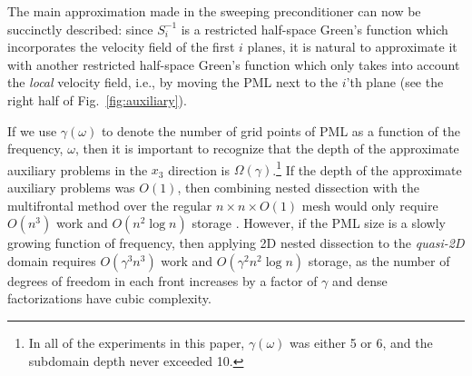 The main approximation made in the sweeping preconditioner can now be 
succinctly described: since $S_i^{-1}$ is a restricted half-space Green's 
function which incorporates the velocity field of the first $i$ planes, it is 
natural to approximate it with another restricted half-space
Green's function which only takes into account the {\em local} velocity field,
i.e., by moving the PML next to the $i$'th plane (see the right half of 
Fig.~\ref{fig:auxiliary}). 


If we use $\gamma(\omega)$ to denote the number of grid points of PML as a 
function of the frequency, $\omega$, then it is 
important to recognize that the depth of the approximate auxiliary problems
in the $x_3$ direction is $\Omega(\gamma)$.\footnote{In all of the experiments 
in this paper, $\gamma(\omega)$ was either 5 or 6, and the subdomain depth 
never exceeded 10.}
If the depth of the approximate auxiliary problems was $O(1)$, then 
combining nested dissection with the multifrontal method over the regular 
$n \times n \times O(1)$ mesh would only require $O(n^3)$
work and $O(n^2 \log n)$ storage \cite{George-nested}. 
However, if the PML size is a slowly growing function of frequency, then 
applying 2D nested dissection to the {\em quasi-2D} domain requires 
$O(\gamma^3 n^3)$ work and $O(\gamma^2 n^2 \log n)$ storage,
as the number of degrees of freedom in each front increases by a factor of 
$\gamma$ and dense factorizations have cubic complexity.

